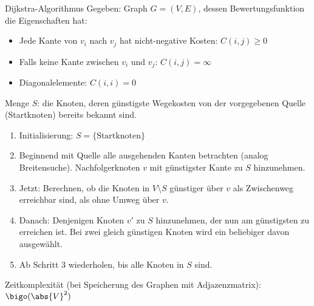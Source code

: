 \begin{algo}{Dijkstra-Algorithmus}
    Gegeben: Graph $G = (V, E)$, dessen Bewertungsfunktion die Eigenschaften hat:
    \begin{itemize}
        \item Jede Kante von $v_i$ nach $v_j$ hat nicht-negative Kosten: $C(i, j) \geq 0$
        \item Falls keine Kante zwischen $v_i$ und $v_j$: $C(i, j) = \infty$
        \item Diagonalelemente: $C(i, i) = 0$
    \end{itemize}

    Menge $S$: die Knoten, deren günstigste Wegekosten von der vorgegebenen Quelle (Startknoten) bereits bekannt sind.

    \begin{enumerate}
        \item Initialisierung: $S = \{ \text{Startknoten} \}$
        \item Beginnend mit Quelle alle ausgehenden Kanten betrachten (analog Breitensuche). Nachfolgerknoten $v$ mit günstigster Kante zu $S$ hinzunehmen.
        \item Jetzt: Berechnen, ob die Knoten in $V \setminus S$ günstiger über $v$ als Zwischenweg erreichbar sind, als ohne Umweg über $v$.
        \item Danach: Denjenigen Knoten $v'$ zu $S$ hinzunehmen, der nun am günstigsten zu erreichen ist. Bei zwei gleich günstigen Knoten wird ein beliebiger davon ausgewählt.
        \item Ab Schritt 3 wiederholen, bis alle Knoten in $S$ sind.
    \end{enumerate}

    Zeitkomplexität (bei Speicherung des Graphen mit Adjazenzmatrix): $\bigo(\abs{V}^2)$
\end{algo}

